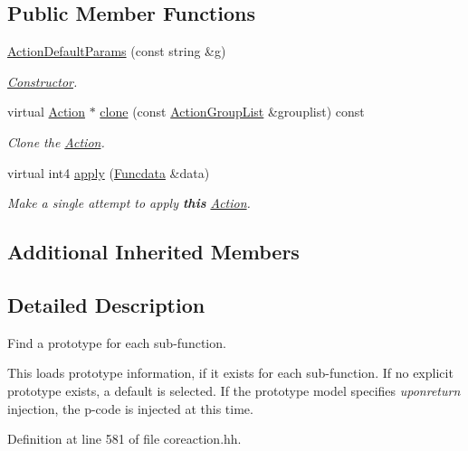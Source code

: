 \subsection*{Public Member Functions}
\begin{DoxyCompactItemize}
\item 
\mbox{\hyperlink{class_action_default_params_a4403cc154f16ac01a6e773e9e43789ce}{Action\+Default\+Params}} (const string \&g)
\begin{DoxyCompactList}\small\item\em \mbox{\hyperlink{class_constructor}{Constructor}}. \end{DoxyCompactList}\item 
virtual \mbox{\hyperlink{class_action}{Action}} $\ast$ \mbox{\hyperlink{class_action_default_params_ab1eaa217e71047b924bf0decd2f067a1}{clone}} (const \mbox{\hyperlink{class_action_group_list}{Action\+Group\+List}} \&grouplist) const
\begin{DoxyCompactList}\small\item\em Clone the \mbox{\hyperlink{class_action}{Action}}. \end{DoxyCompactList}\item 
virtual int4 \mbox{\hyperlink{class_action_default_params_a32f4c196d02d9f86c66749b9bf5d2247}{apply}} (\mbox{\hyperlink{class_funcdata}{Funcdata}} \&data)
\begin{DoxyCompactList}\small\item\em Make a single attempt to apply {\bfseries{this}} \mbox{\hyperlink{class_action}{Action}}. \end{DoxyCompactList}\end{DoxyCompactItemize}
\subsection*{Additional Inherited Members}


\subsection{Detailed Description}
Find a prototype for each sub-\/function. 

This loads prototype information, if it exists for each sub-\/function. If no explicit prototype exists, a default is selected. If the prototype model specifies {\itshape uponreturn} injection, the p-\/code is injected at this time. 

Definition at line 581 of file coreaction.\+hh.




